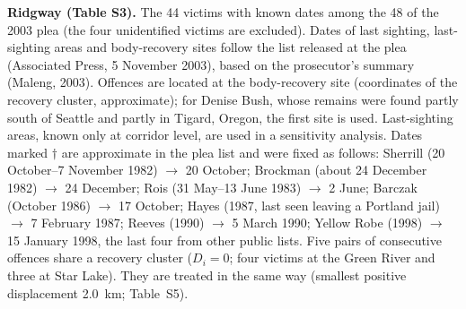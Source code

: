 \documentclass[11pt,a4paper]{article}
\begin{document}
\textbf{Ridgway (Table S3).} The 44 victims with known dates among the 48 of the 2003 plea (the four unidentified victims are excluded). Dates of last sighting, last-sighting areas and body-recovery sites follow the list released at the plea (Associated Press, 5 November 2003), based on the prosecutor's summary (Maleng, 2003). Offences are located at the body-recovery site (coordinates of the recovery cluster, approximate); for Denise Bush, whose remains were found partly south of Seattle and partly in Tigard, Oregon, the first site is used. Last-sighting areas, known only at corridor level, are used in a sensitivity analysis. Dates marked $\dagger$ are approximate in the plea list and were fixed as follows: Sherrill (20 October--7 November 1982) $\to$ 20 October; Brockman (about 24 December 1982) $\to$ 24 December; Rois (31 May--13 June 1983) $\to$ 2 June; Barczak (October 1986) $\to$ 17 October; Hayes (1987, last seen leaving a Portland jail) $\to$ 7 February 1987; Reeves (1990) $\to$ 5 March 1990; Yellow Robe (1998) $\to$ 15 January 1998, the last four from other public lists. Five pairs of consecutive offences share a recovery cluster ($D_i=0$; four victims at the Green River and three at Star Lake). They are treated in the same way (smallest positive displacement 2.0~km; Table~S5).
\end{document}
